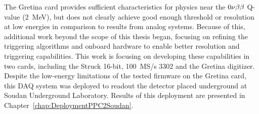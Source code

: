 	The Gretina card provides sufficient characteristics for physics near the $0 \nu \beta \beta$ Q-value (2~MeV), but does not clearly 
achieve good enough threshold or resolution at low energies in comparison to results from analog systems.  Because of this, additional work beyond the scope of this thesis began, focusing on refining the triggering algorithms and onboard hardware to enable better resolution and triggering capabilities.  This work is focusing on developing these capabilities in two cards, including the Struck 16-bit, 100~MS/s 3302 and the Gretina digitizer.  Despite the low-energy limitations of the tested firmware on the Gretina card, this DAQ system was deployed to readout the  detector placed underground at Soudan Underground Laboratory.  Results of this deployment are presented in Chapter~\ref{chap:DeploymentPPC2Soudan}.
